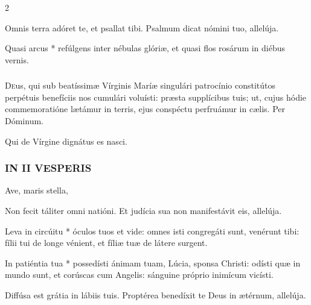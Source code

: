 \documentclass[9pt,twoside]{extarticle}
\begin{document}
\begin{multicols}{2}
\begin{tightlist}{}
\item {} Omnis terra adóret te, et psallat tibi.  Psalmum dicat nómini tuo, allelúja.
\item {} Quasi arcus * refúlgens inter nébulas glóriæ, et quasi flos rosárum in diébus vernis.
\end{tightlist}

\subsubsection*{\center {}}
\lettrine{D}eus, qui sub beatíssimæ Vírginis Maríæ singulári patrocínio constitútos perpétuis benefíciis nos cumulári voluísti: præsta supplícibus tuis; ut, cujus hódie commemoratióne lætámur in terris, ejus conspéctu perfruámur in cælis. Per Dóminum.

\begin{tightlist}{}
\item {\small {}
\item {} Qui de Vírgine dignátus es nasci. }
\end{tightlist}

\subsubsection*{\center \textsc{IN II VESPERIS}}
\begin{tightlist}{}
\item {\small {} Ave, maris stella, }
\item {} Non fecit táliter omni natióni.  Et judícia sua non manifestávit eis, allelúja.
\item {} Leva in circúitu * óculos tuos et vide: omnes isti congregáti sunt, venérunt tibi: fílii tui de longe vénient, et fíliæ tuæ de látere surgent.
\item {\small {}}
\item {} In patiéntia tua * possedísti ánimam tuam, Lúcia, sponsa Christi: odísti quæ in mundo sunt, et corúscas cum Angelis: sánguine próprio inimícum vicísti.
\item {} Diffúsa est grátia in lábiis tuis.  Proptérea benedíxit te Deus in ætérnum, allelúja.
\end{tightlist}


\end{multicols}
\end{document}
